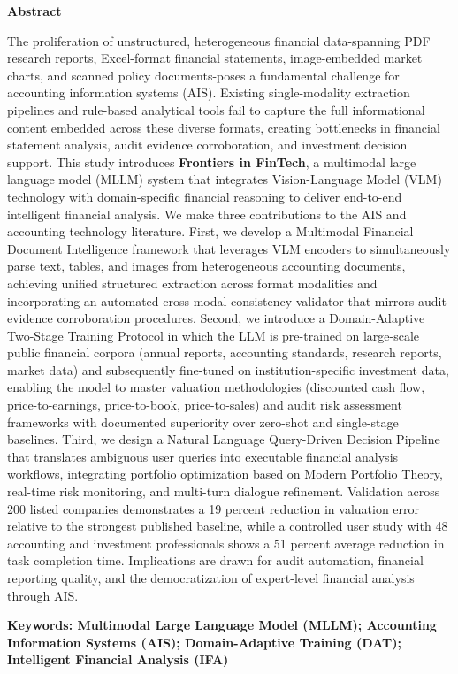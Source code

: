 \documentclass[12pt,letterpaper]{article}
\begin{document}
{%
\begin{center}{\large\bfseries Abstract}\end{center}
\vspace{-4pt}
\noindent%
The proliferation of unstructured, heterogeneous financial data-spanning
PDF research reports, Excel-format financial statements, image-embedded
market charts, and scanned policy documents-poses a fundamental challenge
for accounting information systems (AIS).
Existing single-modality extraction pipelines and rule-based analytical
tools fail to capture the full informational content embedded across these
diverse formats, creating bottlenecks in financial statement analysis,
audit evidence corroboration, and investment decision support.
This study introduces \textbf{Frontiers in FinTech}, a multimodal large language model
(MLLM) system that integrates Vision-Language Model (VLM) technology with
domain-specific financial reasoning to deliver end-to-end intelligent
financial analysis.
We make three contributions to the AIS and accounting technology literature.
First, we develop a Multimodal Financial Document Intelligence
framework that leverages VLM encoders to simultaneously parse text, tables,
and images from heterogeneous accounting documents, achieving unified
structured extraction across format modalities and incorporating an
automated cross-modal consistency validator that mirrors audit evidence
corroboration procedures.
Second, we introduce a Domain-Adaptive Two-Stage Training Protocol
in which the LLM is pre-trained on large-scale public financial corpora
(annual reports, accounting standards, research reports, market data) and
subsequently fine-tuned on institution-specific investment data,
enabling the model to master valuation methodologies (discounted cash
flow, price-to-earnings, price-to-book, price-to-sales) and audit risk
assessment frameworks with documented superiority over zero-shot and
single-stage baselines.
Third, we design a Natural Language Query-Driven Decision Pipeline
that translates ambiguous user queries into executable financial analysis
workflows, integrating portfolio optimization based on Modern Portfolio
Theory, real-time risk monitoring, and multi-turn dialogue refinement.
Validation across 200 listed companies demonstrates a 19 percent reduction
in valuation error relative to the strongest published baseline, while
a controlled user study with 48 accounting and investment professionals
shows a 51 percent average reduction in task completion time.
Implications are drawn for audit automation, financial reporting quality,
and the democratization of expert-level financial analysis through AIS.%

\vspace{8pt}
\noindent
\textbf{Keywords: Multimodal Large Language Model (MLLM); Accounting Information Systems (AIS); Domain-Adaptive Training (DAT); Intelligent Financial Analysis (IFA)}
}%
\end{document}
